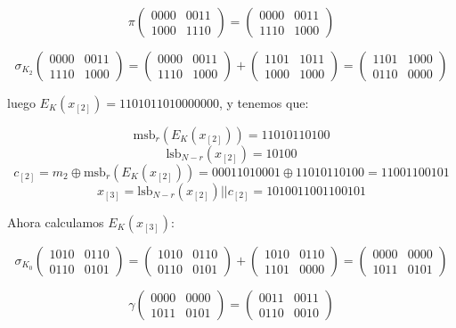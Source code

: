 \documentclass[a4paper]{article}
\begin{document}
$$\pi \begin{pmatrix} 0000 & 0011 \\ 1000 & 1110 \end{pmatrix} = \begin{pmatrix} 0000 & 0011 \\ 1110 & 1000 \end{pmatrix}$$

$$\sigma_{K_2} \begin{pmatrix} 0000 & 0011 \\ 1110 & 1000 \end{pmatrix} = \begin{pmatrix} 0000 & 0011 \\ 1110 & 1000 \end{pmatrix} + \begin{pmatrix} 1101 & 1011 \\ 1000 & 1000 \end{pmatrix} = \begin{pmatrix} 1101 & 1000 \\ 0110 & 0000 \end{pmatrix}$$

luego $E_K(x_{[2]}) = 1101 0110 1000 0000$, y tenemos que:

$$\text{msb}_r (E_K(x_{[2]})) = 1101 0110 100$$
$$\text{lsb}_{N-r} (x_{[2]}) = 10100$$
$$c_{[2]} = m_2 \oplus \text{msb}_r(E_K(x_{[2]})) = 0 0011 0100 01 \oplus 1101 0110 100 = 1100 1100 101$$
$$x_{[3]} = \text{lsb}_{N-r} (x_{[2]}) || c_{[2]} = 1010 0110 0110 0101$$

Ahora calculamos $E_K(x_{[3]})$:

$$\sigma_{K_0} \begin{pmatrix} 1010 & 0110 \\ 0110 & 0101 \end{pmatrix} = \begin{pmatrix} 1010 & 0110 \\ 0110 & 0101 \end{pmatrix} + \begin{pmatrix} 1010 & 0110 \\ 1101 & 0000 \end{pmatrix} = \begin{pmatrix} 0000 & 0000 \\ 1011 & 0101 \end{pmatrix}$$

$$\gamma \begin{pmatrix} 0000 & 0000 \\ 1011 & 0101 \end{pmatrix} = \begin{pmatrix} 0011 & 0011 \\ 0110 & 0010 \end{pmatrix}$$
\end{document}
